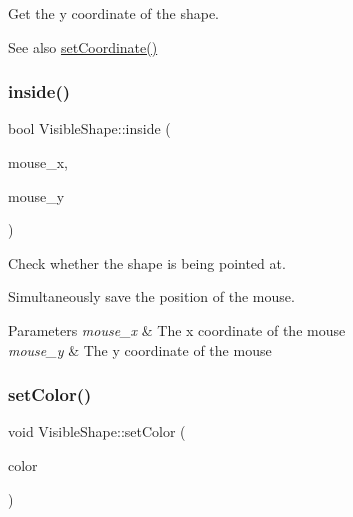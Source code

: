 Get the y coordinate of the shape. 

\begin{DoxySeeAlso}{See also}
\mbox{\hyperlink{class_visible_shape_a350f7faac22e405df7c4012fe9d03fac}{set\+Coordinate()}} 
\end{DoxySeeAlso}
\mbox{\label{class_visible_shape_aab5199578030849314f0c6a339aa4281}} 
\subsubsection{\texorpdfstring{inside()}{inside()}}
{\footnotesize\ttfamily bool Visible\+Shape\+::inside (\begin{DoxyParamCaption}\item[{const int \&}]{mouse\+\_\+x,  }\item[{const int \&}]{mouse\+\_\+y }\end{DoxyParamCaption})\hspace{0.3cm}{\ttfamily [virtual]}}



Check whether the shape is being pointed at. 

Simultaneously save the position of the mouse. 
\begin{DoxyParams}{Parameters}
{\em mouse\+\_\+x} & The x coordinate of the mouse \\
\hline
{\em mouse\+\_\+y} & The y coordinate of the mouse \\
\hline
\end{DoxyParams}
\mbox{\label{class_visible_shape_a69ae0940d090fec376bee8dc6861b8dc}} 
\subsubsection{\texorpdfstring{set\+Color()}{setColor()}}
{\footnotesize\ttfamily void Visible\+Shape\+::set\+Color (\begin{DoxyParamCaption}\item[{const \mbox{\hyperlink{class_r_g_b_color}{R\+G\+B\+Color}} \&}]{color }\end{DoxyParamCaption})\hspace{0.3cm}{\ttfamily [virtual]}}



